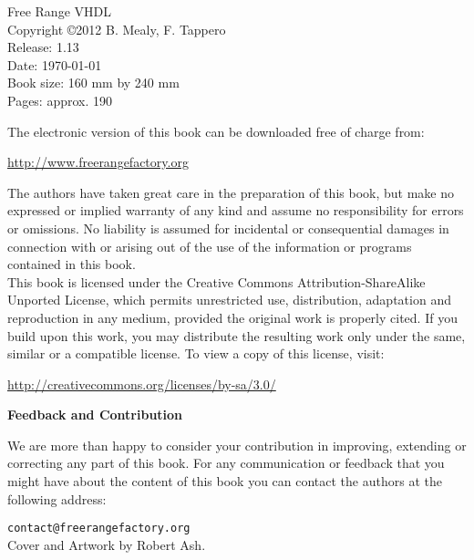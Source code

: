 %
%
\setcounter{page}{1}

{\footnotesize
\noindent
Free Range VHDL\\
Copyright \copyright 2012 B. Mealy, F. Tappero\\
Release: 1.13\\
Date: \today\\
Book size: 160 mm by 240 mm\\
Pages: approx. 190\\
\vspace{20pt}

\noindent
The electronic version of this book can be downloaded free of charge from:

\noindent
\url{http://www.freerangefactory.org}

\vspace{15pt}

\noindent
The authors have taken great care in the preparation of this book, but make no expressed or implied warranty of any kind and assume no responsibility for errors or omissions. No liability is assumed for incidental or consequential damages in connection with or arising out of the use of the information or programs contained in this book.\\

\noindent
This book is licensed under the Creative Commons Attribution-ShareAlike Unported License, which permits unrestricted use, distribution, adaptation and reproduction in any medium, provided the original work is properly cited. If you build upon this work, you may distribute the resulting work only under the same, similar or a compatible license. To view a copy of this license, visit:

\noindent
\url{http://creativecommons.org/licenses/by-sa/3.0/}
\vspace{25pt}

\noindent
{\sffamily\bfseries Feedback and Contribution}

\noindent
We are more than happy to consider your contribution in improving, extending or correcting any part of this book.
For any communication or feedback that you might have about the content of this book you can contact the authors at the following address:

\noindent
\texttt{contact@freerangefactory.org}\\

\vfill
\noindent
Cover and Artwork by Robert Ash.

} %
